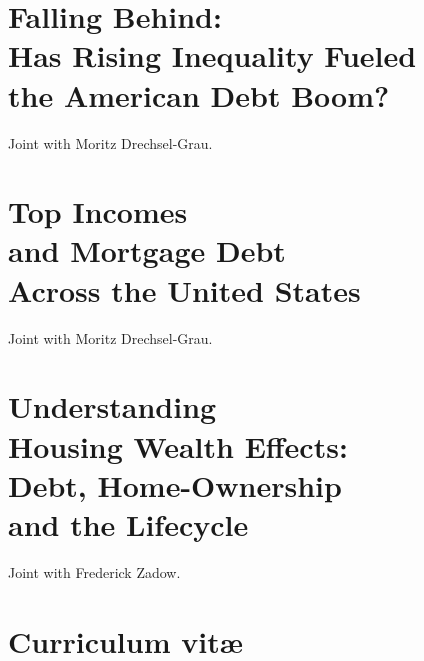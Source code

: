\documentclass[12pt,a4paper]{book}
\begin{document}
\chapter[Falling Behind]{Falling Behind: \\ Has Rising Inequality Fueled \\ the American Debt Boom?}
\label{chp:falling-behind}

Joint with Moritz Drechsel-Grau.

%

\begin{subappendices}
%  
\end{subappendices}

\chapter[Top Incomes and Mortgage Debt]{Top Incomes \\ and Mortgage Debt \\ Across the United States}

Joint with Moritz Drechsel-Grau.

%

%  

\chapter[Understanding Housing Wealth Effects]{Understanding \\ Housing Wealth Effects: \\ Debt, Home-Ownership \\ and the Lifecycle}
\label{chp:understanding}

Joint with Frederick Zadow.

%

\begin{subappendices}
%  
\end{subappendices}


%


\chapter*{Curriculum vit\ae{}}
\end{document}

